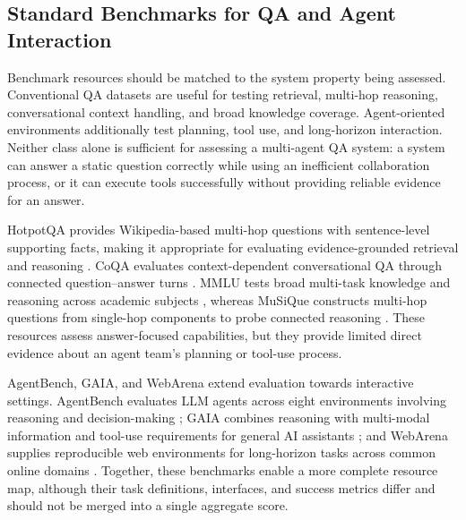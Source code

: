 \subsection{Standard Benchmarks for QA and Agent Interaction}
\label{sec:benchmark_datasets}

Benchmark resources should be matched to the system property being assessed.
Conventional QA datasets are useful for testing retrieval, multi-hop
reasoning, conversational context handling, and broad knowledge coverage.
Agent-oriented environments additionally test planning, tool use, and
long-horizon interaction. Neither class alone is sufficient for assessing a
multi-agent QA system: a system can answer a static question correctly while
using an inefficient collaboration process, or it can execute tools
successfully without providing reliable evidence for an answer.

HotpotQA provides Wikipedia-based multi-hop questions with sentence-level
supporting facts, making it appropriate for evaluating evidence-grounded
retrieval and reasoning \citep{yang2018hotpotqa}. CoQA evaluates
context-dependent conversational QA through connected question--answer
turns \citep{reddy2019coqa}. MMLU tests broad multi-task knowledge and
reasoning across academic subjects \citep{hendrycks2021mmlu}, whereas MuSiQue
constructs multi-hop questions from single-hop components to probe connected
reasoning \citep{trivedi2022musique}. These resources assess answer-focused
capabilities, but they provide limited direct evidence about an agent team's
planning or tool-use process.

AgentBench, GAIA, and WebArena extend evaluation towards interactive settings.
AgentBench evaluates LLM agents across eight environments involving reasoning
and decision-making \citep{liu2024agentbench}; GAIA combines reasoning with
multi-modal information and tool-use requirements for general AI assistants
\citep{mialon2024gaia}; and WebArena supplies reproducible web environments
for long-horizon tasks across common online domains \citep{zhou2024webarena}.
Together, these benchmarks enable a more complete resource map, although
their task definitions, interfaces, and success metrics differ and should not
be merged into a single aggregate score.

